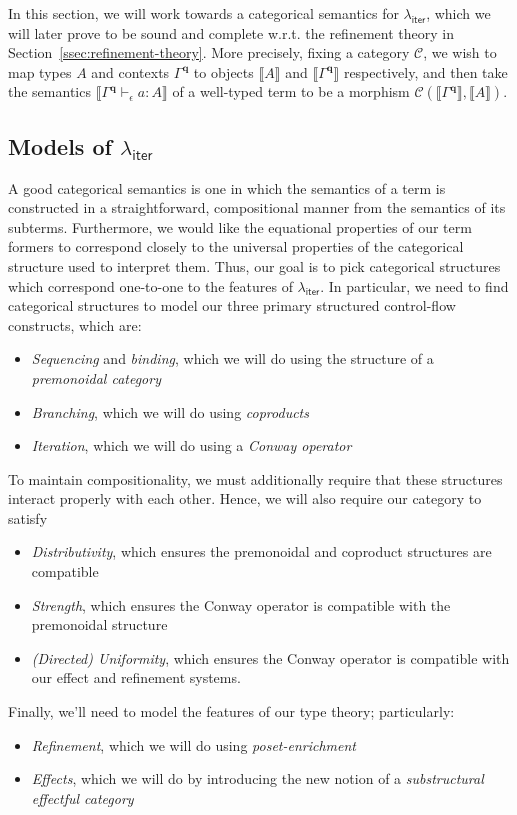 \documentclass[acmsmall,screen,review]{acmart}
\newcommand{\mc}[1]{\ensuremath{\mathcal{#1}}}
\newcommand{\mb}[1]{\ensuremath{\mathbf{#1}}}
\newcommand{\ms}[1]{\ensuremath{\mathsf{#1}}}
\newcommand{\hasty}[4]{#1 \vdash_{#2} #3: {#4}}
\newcommand{\dnt}[1]{\llbracket{#1}\rrbracket}
\newcommand{\subiterexp}{\texorpdfstring{\(\lambda_{\ms{iter}}\)}{lambda-iter}}
\begin{document}
In this section, we will work towards a categorical semantics for \subiterexp{}, which we will later
prove to be sound and complete w.r.t. the refinement theory in Section~\ref{ssec:refinement-theory}.
More precisely, fixing a category $\mc{C}$, we wish to map types $A$ and contexts $\Gamma^{\mb{q}}$
to objects $\dnt{A}$ and $\dnt{\Gamma^{\mb{q}}}$ respectively, and then take the semantics
$\dnt{\hasty{\Gamma^{\mb{q}}}{\epsilon}{a}{A}}$ of a well-typed term to be a morphism
$\mc{C}(\dnt{\Gamma^{\mb{q}}}, \dnt{A})$.

\subsection{Models of \subiterexp{}}

A good categorical semantics is one in which the semantics of a term is constructed in a
straightforward, compositional manner from the semantics of its subterms. Furthermore, we would like
the equational properties of our term formers to correspond closely to the universal properties of
the categorical structure used to interpret them. Thus, our goal is to pick categorical structures
which correspond  one-to-one to the features of \subiterexp{}. In
particular, we need to find categorical structures to model our three primary structured
control-flow constructs, which are:
\begin{itemize}
  \item \emph{Sequencing} and \emph{binding}, which we will do using the structure of a
  \emph{premonoidal category}
  \item \emph{Branching}, which we will do using \emph{coproducts}
  \item \emph{Iteration}, which we will do using a \emph{Conway operator}
\end{itemize}
To maintain compositionality, we must additionally require that these structures interact properly with each other. Hence, we will also require our category to satisfy
\begin{itemize}
  \item \emph{Distributivity}, which ensures the premonoidal and coproduct structures are compatible
  \item \emph{Strength}, which ensures the Conway operator is compatible with the premonoidal
  structure
  \item \emph{(Directed) Uniformity}, which ensures the Conway operator is compatible with our
  effect and refinement systems.
\end{itemize}
Finally, we'll need to model the features of our type theory; particularly:
\begin{itemize}
  \item \emph{Refinement}, which we will do using \emph{poset-enrichment}
  \item \emph{Effects}, which we will do by introducing the new notion of a \emph{substructural
  effectful category}
\end{itemize}
\end{document}
